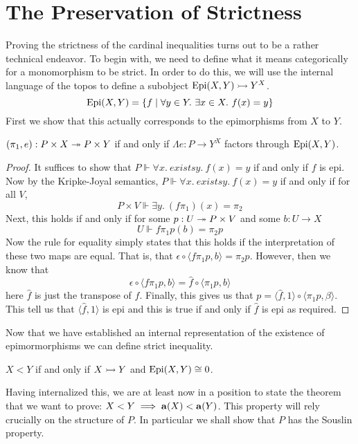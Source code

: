 \section{The Preservation of Strictness}\label{sec:strictness}

Proving the strictness of the cardinal inequalities turns out to be a
rather technical endeavor. To begin with, we need to define what it
means categorically for a monomorphism to be strict. In order to do
this, we will use the internal language of the topos to define a
subobject $\operatorname{Epi}(X, Y) \rightarrowtail Y^X$.
\[
  \epis(X, Y) = \{f \mid \forall y \in Y.\ \exists x \in X.\ f(x) = y\}
\]
First we show that this actually corresponds to the epimorphisms from
$X$ to $Y$.

\begin{lem}\label{lem:strictness:epis}
  $(\pi_1, e) : P \times X \twoheadrightarrow P \times Y$ if and only if
  $\Lambda e : P \to Y^X$ factors through $\operatorname{Epi}(X, Y)$.
\end{lem}
\begin{proof}
  It suffices to show that $P \Vdash \forall x.\ exists y.\ f(x) = y$
  if and only if $f$ is epi. Now by the Kripke-Joyal semantics,
  $P \Vdash \forall x.\ exists y.\ f(x) = y$ if and only if for all
  $V$,
  \[
    P \times V \Vdash \exists y.\ (f\pi_1)(x) = \pi_2
  \]
  Next, this holds if and only if for some $p : U \twoheadrightarrow P \times V$
  and some $b : U \to X$
  \[
    U \Vdash f\pi_1p(b) = \pi_2p
  \]
  Now the rule for equality simply states that this holds if the
  interpretation of these two maps are equal. That is, that
  $\epsilon \circ \langle f\pi_1p, b \rangle = \pi_2p$. However, then
  we know that
  \[
    \epsilon \circ \langle f\pi_1p, b \rangle =
    \hat{f} \circ \langle \pi_1 p, b \rangle
  \]
  here $\hat{f}$ is just the transpose of $f$. Finally, this gives us that
  $p = \langle \hat{f}, 1 \rangle \circ \langle \pi_1 p, \beta \rangle$.
  This tell us that $\langle \hat{f}, 1 \rangle$ is epi and this is
  true if and only if $\hat{f}$ is epi as required.
\end{proof}

Now that we have established an internal representation of the
existence of epimormorphisms we can define strict inequality.

\begin{defn}
  $X < Y$ if and only if $X \rightarrowtail Y$ and $\operatorname{Epi}(X, Y) \cong 0$.
\end{defn}

Having internalized this, we are at least now in a position to state
the theorem that we want to prove:
$X < Y \implies \mathbf{a}(X) < \mathbf{a}(Y)$. This property will rely
crucially on the structure of $P$. In particular we shall show that
$P$ has the Souslin property.

